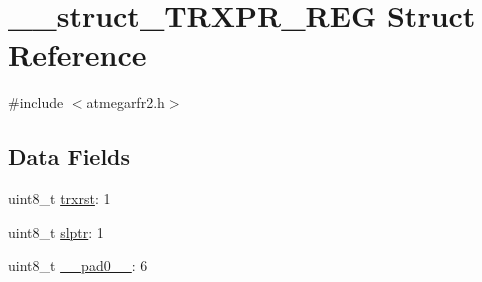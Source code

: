 \hypertarget{struct____struct___t_r_x_p_r___r_e_g}{\section{\-\_\-\-\_\-struct\-\_\-\-T\-R\-X\-P\-R\-\_\-\-R\-E\-G Struct Reference}
\label{struct____struct___t_r_x_p_r___r_e_g}
}


{\ttfamily \#include $<$atmegarfr2.\-h$>$}

\subsection*{Data Fields}
\begin{DoxyCompactItemize}
\item 
uint8\-\_\-t \hyperlink{struct____struct___t_r_x_p_r___r_e_g_ae133f19ba214b1493f024e7a988b0c59}{trxrst}\-: 1
\item 
uint8\-\_\-t \hyperlink{struct____struct___t_r_x_p_r___r_e_g_ae0b2852895a8a841631cf1dafe4831fc}{slptr}\-: 1
\item 
uint8\-\_\-t \hyperlink{struct____struct___t_r_x_p_r___r_e_g_aa69994dc09d933472ce116e5f2c66311}{\-\_\-\-\_\-pad0\-\_\-\-\_\-}\-: 6
\end{DoxyCompactItemize}


